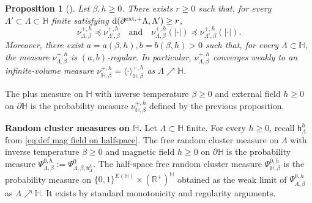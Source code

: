 \documentclass[11pt,a4paper]{article}
\numberwithin{equation}{section}
\theoremstyle{plain}
\newtheorem{Prop}[Thm]{Proposition}
\theoremstyle{definition}
\begin{document}
\begin{Prop}[]\label{prop:reg_plus half-space} 
Let $\beta,h \geq 0$. There exists $r\geq 0$ such that, for every $\Lambda'\subset \Lambda \subset \mathbb H$ finite satisfying $\mathrm{d}(\partial^{\textup{ext},+} \Lambda,\Lambda')\geq r$,
\begin{equation}\label{eq:spin-absolute value monotonicity half-space}
\nu_{\Lambda,\beta}^{+,h} \preccurlyeq \nu_{\Lambda',\beta}^{+,h} \quad \text{and} \quad \nu_{\Lambda,\beta}^{+,h}(|\cdot|) \preccurlyeq \nu_{\Lambda',\beta}^{+,h}(|\cdot|).
\end{equation} Moreover, there exist $a=a(\beta,h),b=b(\beta,h)>0$ such that, for every $\Lambda\subset \mathbb H$, the measure $\nu^{+,h}_{\Lambda,\beta}$ is $(a,b)$-regular. In particular, $\nu^{+,h}_{\Lambda,\beta}$ converges weakly to an infinite-volume measure $\nu^{+,h}_{\mathbb{H},\beta}=\langle \cdot\rangle^{+,h}_{\mathbb H,\beta}$ as $\Lambda\nearrow \mathbb H$. 
\end{Prop}

The plus measure on $\mathbb H$ with inverse temperature $\beta \geq 0$ and external field $h\geq 0$ on $\partial \mathbb H$ is the probability measure $\nu^{+,h}_{\mathbb H, \beta}$ defined by the previous proposition.




\medskip

\noindent\textbf{Random cluster measures on $\mathbb H$.} Let $\Lambda \subset \mathbb H$ finite. For every $h \geq 0$, recall $\mathsf h^h_\Lambda$ from \eqref{eq:def mag field on halfspace}. The free random cluster measure on $\Lambda$ with inverse temperature $\beta \geq 0$ and magnetic field $h \geq 0$ on $\partial \mathbb H$ is the probability measure
$\Psi^{0,h}_{\Lambda, \beta}:=\Psi^0_{\Lambda, \beta, \mathsf h^h_\Lambda}$. The half-space free random cluster measure
$\Psi^{0,h}_{\mathbb H,\beta}$ is the probability measure on $\{0,1\}^{E(\mathbb H)} \times (\mathbb R^+)^\mathbb H$ obtained as the weak limit of $\Psi^{0,h}_{\Lambda, \beta}$ as $\Lambda\nearrow \mathbb H$. It exists by standard monotonicity and regularity arguments.
\end{document}
